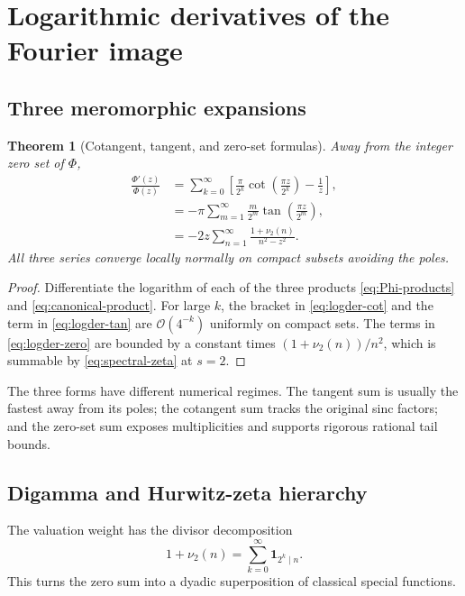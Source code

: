 \documentclass[11pt]{article}
\newtheorem{theorem}{Theorem}[section]
\theoremstyle{definition}
\theoremstyle{remark}
\newcommand{\bigO}{\mathcal O}
\newcommand{\one}{\mathbf 1}
\begin{document}
\section{Logarithmic derivatives of the Fourier image}

\subsection{Three meromorphic expansions}

\begin{theorem}[Cotangent, tangent, and zero-set formulas]\label{thm:three-logder}
Away from the integer zero set of \(\Phi\),
\begin{align}
 \frac{\Phi'(z)}{\Phi(z)}
 &=\sum_{k=0}^{\infty}
 \left[
 \frac{\pi}{2^k}\cot\!\left(\frac{\pi z}{2^k}\right)-\frac1z
 \right],                                                    \label{eq:logder-cot}\\
 &=-\pi\sum_{m=1}^{\infty}\frac{m}{2^m}
 \tan\!\left(\frac{\pi z}{2^m}\right),                    \label{eq:logder-tan}\\
 &=-2z\sum_{n=1}^{\infty}\frac{1+\nu_2(n)}{n^2-z^2}.       \label{eq:logder-zero}
\end{align}
All three series converge locally normally on compact subsets avoiding the poles.
\end{theorem}

\begin{proof}
Differentiate the logarithm of each of the three products
\eqref{eq:Phi-products} and \eqref{eq:canonical-product}.  For large \(k\), the bracket
in \eqref{eq:logder-cot} and the term in \eqref{eq:logder-tan} are \(\bigO(4^{-k})\)
uniformly on compact sets.  The terms in \eqref{eq:logder-zero} are bounded by a constant
times \((1+\nu_2(n))/n^2\), which is summable by \eqref{eq:spectral-zeta} at \(s=2\).
\end{proof}

The three forms have different numerical regimes.  The tangent sum is usually the fastest
away from its poles; the cotangent sum tracks the original sinc factors; and the zero-set
sum exposes multiplicities and supports rigorous rational tail bounds.

\subsection{Digamma and Hurwitz-zeta hierarchy}

The valuation weight has the divisor decomposition
\begin{equation}
 1+\nu_2(n)=\sum_{k=0}^{\infty}\one_{2^k\mid n}.             \label{eq:valuation-indicators}
\end{equation}
This turns the zero sum into a dyadic superposition of classical special functions.
\end{document}
